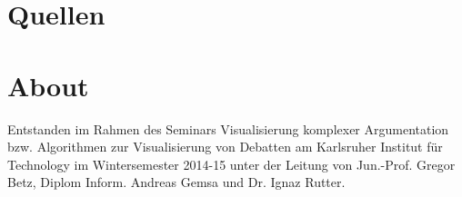 \documentclass[a4paper, oneside]{scrartcl}
\begin{document}
% 

\section{Quellen}


\section*{About}
Entstanden im Rahmen des Seminars Visualisierung komplexer Argumentation bzw. Algorithmen zur Visualisierung von Debatten 
am Karlsruher Institut für Technology im Wintersemester 2014-15 unter der Leitung von 
Jun.-Prof. Gregor Betz, Diplom Inform. Andreas Gemsa und Dr. Ignaz Rutter.


\end{document}
